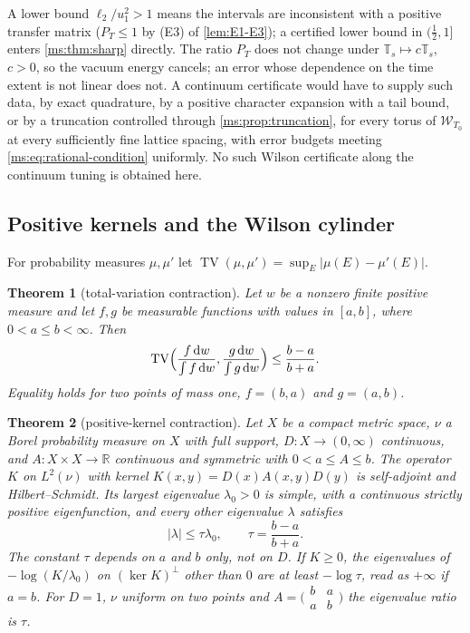\documentclass[11pt,a4paper]{amsart}
\newtheorem{theorem}{Theorem}[section]
\theoremstyle{definition}
\theoremstyle{remark}
\numberwithin{equation}{section}
\DeclareMathOperator{\TV}{TV}        %
\newcommand{\R}{\mathbb{R}}          %
\newcommand{\Wwin}{\mathcal{W}}      %
\newcommand{\abs}[1]{\lvert #1\rvert}      %
\newcommand{\dd}{\,\mathrm{d}}             %
\newcommand{\TT}{\mathbb{T}}               %
\begin{document}
A lower bound $\ell_2/u_1^2>1$ means the intervals are inconsistent with a positive transfer matrix ($P_T\le1$ by (E3) of \cref{lem:E1-E3}); a certified lower bound in $(\frac12,1]$ enters \cref{ms:thm:sharp} directly. The ratio $P_T$ does not change under $\TT_s\mapsto c\TT_s$, $c>0$, so the vacuum energy cancels; an error whose dependence on the time extent is not linear does not. A continuum certificate would have to supply such data, by exact quadrature, by a positive character expansion with a tail bound, or by a truncation controlled through \cref{ms:prop:truncation}, for every torus of $\Wwin_{T_0}$ at every sufficiently fine lattice spacing, with error budgets meeting \eqref{ms:eq:rational-condition} uniformly. No such Wilson certificate along the continuum tuning is obtained here.

\subsection{Positive kernels and the Wilson cylinder}

For probability measures $\mu,\mu'$ let $\TV(\mu,\mu')=\sup_E\abs{\mu(E)-\mu'(E)}$.

\begin{theorem}[total-variation contraction]\label{ms:lem:tv}
Let $w$ be a nonzero finite positive measure and let $f,g$ be measurable functions with values in $[a,b]$, where $0<a\le b<\infty$. Then
\[
\TV\Bigl(\frac{f\dd w}{\int f\dd w},\frac{g\dd w}{\int g\dd w}\Bigr)\le\frac{b-a}{b+a}.
\]
Equality holds for two points of mass one, $f=(b,a)$ and $g=(a,b)$.
\end{theorem}

\begin{theorem}[positive-kernel contraction]\label{ms:thm:kernel}
Let $X$ be a compact metric space, $\nu$ a Borel probability measure on $X$ with full support, $D\colon X\to(0,\infty)$ continuous, and $A\colon X\times X\to\R$ continuous and symmetric with $0<a\le A\le b$. The operator $K$ on $L^2(\nu)$ with kernel $K(x,y)=D(x)A(x,y)D(y)$ is self-adjoint and Hilbert--Schmidt. Its largest eigenvalue $\lambda_0>0$ is simple, with a continuous strictly positive eigenfunction, and every other eigenvalue $\lambda$ satisfies
\[
\abs{\lambda}\le\tau\lambda_0,\qquad \tau=\frac{b-a}{b+a}.
\]
The constant $\tau$ depends on $a$ and $b$ only, not on $D$. If $K\ge0$, the eigenvalues of $-\log(K/\lambda_0)$ on $(\ker K)^\perp$ other than $0$ are at least $-\log\tau$, read as $+\infty$ if $a=b$. For $D=1$, $\nu$ uniform on two points and $A=\bigl(\begin{smallmatrix}b&a\\a&b\end{smallmatrix}\bigr)$ the eigenvalue ratio is $\tau$.
\end{theorem}
\end{document}
